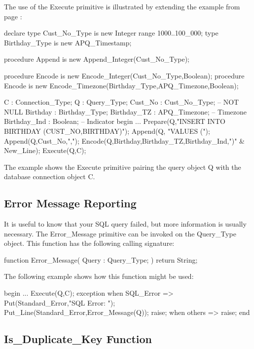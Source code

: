 \documentclass[english,letterpaper]{book}
\begin{document}
The use of the Execute primitive is illustrated by extending the example
from page \pageref{Birthday Timezone Example}:

\begin{Example}
declare
   type Cust_No_Type is new Integer range 1000..100_000;
   type Birthday_Type is new APQ_Timestamp;

   procedure Append is new Append_Integer(Cust_No_Type);

   procedure Encode is new
      Encode_Integer(Cust_No_Type,Boolean);
   procedure Encode is new
      Encode_Timezone(Birthday_Type,APQ_Timezone,Boolean);

   C :            Connection_Type;
   Q :            Query_Type;
   Cust_No :      Cust_No_Type;     -- NOT NULL
   Birthday :     Birthday_Type;
   Birthday_TZ :  APQ_Timezone;     -- Timezone
   Birthday_Ind : Boolean;          -- Indicator
begin
   ...
   Prepare(Q,"INSERT INTO BIRTHDAY (CUST_NO,BIRTHDAY)");
   Append(Q, "VALUES (");
   Append(Q,Cust_No,",");
   Encode(Q,Birthday,Birthday_TZ,Birthday_Ind,")" & New_Line);
   Execute(Q,C);
\end{Example}

The example shows the Execute primitive pairing the query object Q
with the database connection object C.

\subsection{Error Message Reporting\label{Error Message Reporting}}

It is useful to know that your SQL query failed, but more information
is usually necessary. The Error\_Message primitive can be invoked
on the Query\_Type object. This function has the following calling
signature:

\begin{Code}
function Error_Message(
   Query : Query_Type;
) return String;
\end{Code}

The following example shows how this function might be used:

\begin{Example}
begin
   ...
   Execute(Q,C);
exception
   when SQL_Error =>
      Put(Standard_Error,"SQL Error: ");
      Put_Line(Standard_Error,Error_Message(Q));
      raise;
   when others =>
      raise;
end
\end{Example}

\subsection{Is\_Duplicate\_Key Function}
\end{document}
